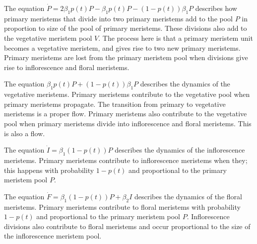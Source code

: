 \documentclass[12pt, oneside]{article}   	%
\begin{document}
\fi

The equation $\dot{P}  = 2 \beta_1 p(t) P - \beta_1 p(t) P - ( 1-p(t) ) \beta_1 P $ describes how primary meristems that divide into two primary meristems add to the pool $P$ in proportion to size of the pool of primary meristems. These divisions also add to the vegetative meristem pool $V$. The process here is that a primary meristem unit becomes a vegetative meristem, and gives rise to two new primary meristems. Primary meristems are lost from the primary meristem pool when divisions give rise to inflorescence and floral meristems.

The equation $ \beta_1 p(t) P + ( 1-p(t) ) \beta_1 P $ describes the dynamics of the vegetative meristems. Primary meristems contribute to the vegetative pool when primary meristems propagate. The transition from primary to vegetative meristems is a proper flow. Primary meristems also contribute to the vegetative pool when primary meristems divide into inflorescence and floral meristems. This is also a flow.
 
The equation $\dot{I} = \beta_1 ( 1-p(t) ) P $ describes the dynamics of the inflorescence meristems. Primary meristems contribute to inflorescence meristems when they; this happens with probability $1-p(t)$ and proportional to the primary meristem pool $P$. 

The equation $\dot{F} = \beta_1 ( 1-p(t) ) P + \beta_2 I$ describes the dynamics of the floral meristems. Primary meristems contribute to floral meristems with probability $1-p(t)$ and proportional to the primary meristem pool $P$. Inflorescence divisions also contribute to floral meristems and occur proportional to the size of the inflorescence meristem pool.

\end{document}
